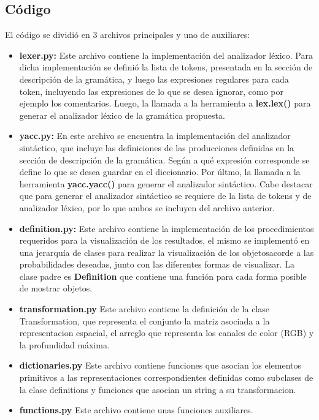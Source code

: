 \subsection{C\'odigo}

El c\'odigo se dividi\'o en 3 archivos principales y uno de auxiliares:
\begin{itemize}
\item [] \textbf{lexer.py:} Este archivo contiene la implementaci\'on del analizador l\'exico. Para dicha implementaci\'on se defini\'o la lista de tokens, presentada en la secci\'on de descripci\'on de la gram\'atica, y luego las expresiones regulares para cada token, incluyendo las expresiones de lo que se desea ignorar, como por ejemplo los comentarios. Luego, la llamada a la herramienta a \textbf{lex.lex()} para generar el analizador l\'exico de la gram\'atica propuesta.

\item [] \textbf{yacc.py:} En este archivo se encuentra la implementaci\'on del analizador sint\'actico, que incluye las definiciones de las producciones definidas en la secci\'on de descripci\'on de la gram\'atica. Seg\'un a qu\'e expresi\'on corresponde se define lo que se desea guardar en el diccionario. Por \'ultmo, la llamada a la herramienta \textbf{yacc.yacc()} para generar el analizador sint\'actico. Cabe destacar que para generar el analizador sint\'actico se requiere de la lista de tokens y de analizador l\'exico, por lo que ambos se incluyen del archivo anterior.

\item [] \textbf{definition.py:} Este archivo contiene la implementaci\'on de los procedimientos requeridos para la visualizaci\'on de los resultados, el mismo se implement\'o en una jerarqu\'ia de clases para realizar la visualizaci\'on de los objetosacorde a las probabilidades deseadas, junto con las diferentes formas de visualizar. La clase padre es \textbf{Definition} que contiene una funci\'on para cada forma posible de mostrar objetos. 

\item [] \textbf{transformation.py} Este archivo contiene la definici\'on de la clase Transformation, que representa el conjunto la matriz asociada a la representacion espacial, el arreglo que representa los canales de color (RGB) y la profundidad m\'axima.

\item [] \textbf{dictionaries.py} Este archivo contiene funciones que asocian los elementos primitivos a las representaciones correspondientes definidas como subclases de la clase definitions y funciones que asocian un string a su transformacion.

\item [] \textbf{functions.py} Este archivo contiene unas funciones auxiliares.
\end{itemize}

